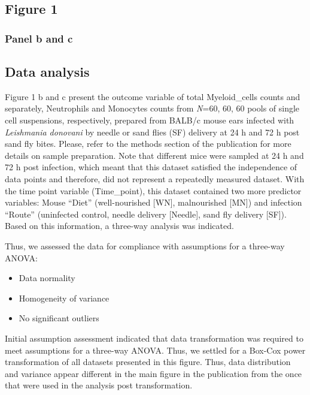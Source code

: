 \documentclass[
  12pt,
  letterpaper,
]{article}
\providecommand{\tightlist}{%
  \setlength{\itemsep}{0pt}\setlength{\parskip}{0pt}}
\begin{document}
\subsection{Figure 1}\label{figure-1}

\subsubsection{Panel b and c}\label{panel-b-and-c}

\subsection{Data analysis}\label{data-analysis}

Figure 1 b and c present the outcome variable of total Myeloid\_cells counts and separately, Neutrophils and Monocytes counts from \emph{N}=60, 60, 60 pools of single cell suspensions, respectively, prepared from BALB/c mouse ears infected with \emph{Leishmania donovani} by needle or sand flies (SF) delivery at 24 h and 72 h post sand fly bites. Please, refer to the methods section of the publication for more details on sample preparation. Note that different mice were sampled at 24 h and 72 h post infection, which meant that this dataset satisfied the independence of data points and therefore, did not represent a repeatedly measured dataset. With the time point variable (Time\_point), this dataset contained two more predictor variables: Mouse ``Diet'' (well-nourished {[}WN{]}, malnourished {[}MN{]}) and infection ``Route'' (uninfected control, needle delivery {[}Needle{]}, sand fly delivery {[}SF{]}). Based on this information, a three-way analysis was indicated.

Thus, we assessed the data for compliance with assumptions for a three-way ANOVA:

\begin{itemize}
\tightlist
\item
  Data normality
\item
  Homogeneity of variance
\item
  No significant outliers
\end{itemize}

Initial assumption assessment indicated that data transformation was required to meet assumptions for a three-way ANOVA. Thus, we settled for a Box-Cox power transformation of all datasets presented in this figure. Thus, data distribution and variance appear different in the main figure in the publication from the once that were used in the analysis post transformation.
\end{document}
